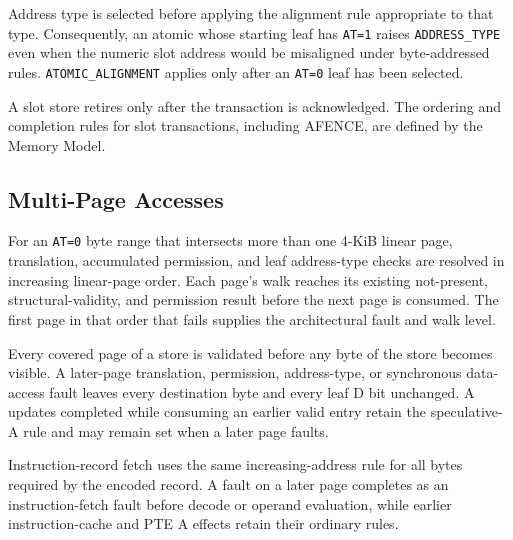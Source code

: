 Address type is selected before applying the alignment rule appropriate to that type. Consequently, an atomic whose
starting leaf has \texttt{AT=1} raises \texttt{ADDRESS\_TYPE} even when the numeric slot address would be misaligned
under byte-addressed rules. \texttt{ATOMIC\_ALIGNMENT} applies only after an \texttt{AT=0} leaf has been selected.

A slot store retires only after the transaction is acknowledged. The ordering and completion rules for slot
transactions, including AFENCE, are defined by the Memory Model.

\subsection{Multi-Page Accesses}
For an \texttt{AT=0} byte range that intersects more than one 4-KiB linear page, translation, accumulated permission,
and leaf address-type checks are resolved in increasing linear-page order. Each page's walk reaches its existing
not-present, structural-validity, and permission result before the next page is consumed. The first page in that order
that fails supplies the architectural fault and walk level.

Every covered page of a store is validated before any byte of the store becomes visible. A later-page translation,
permission, address-type, or synchronous data-access fault leaves every destination byte and every leaf D bit
unchanged. A updates completed while consuming an earlier valid entry retain the speculative-A rule and may remain
set when a later page faults.

Instruction-record fetch uses the same increasing-address rule for all bytes required by the encoded record. A fault
on a later page completes as an instruction-fetch fault before decode or operand evaluation, while earlier
instruction-cache and PTE A effects retain their ordinary rules.
